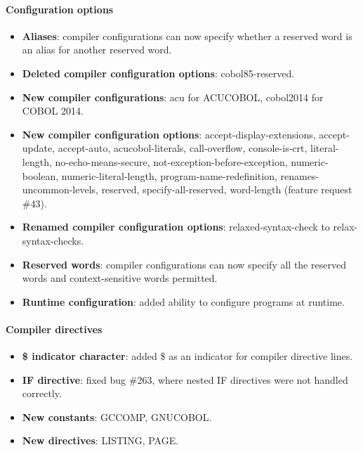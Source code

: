 \paragraph{Configuration options}
\begin{itemize}
\item \textbf{Aliases}: compiler configurations can now specify whether a reserved word is an alias for another reserved word.
\item \textbf{Deleted compiler configuration options}: cobol85-reserved.
\item \textbf{New compiler configurations}: acu for ACUCOBOL, cobol2014 for COBOL 2014.
\item \textbf{New compiler configuration options}: accept-display-extensions, accept-update, accept-auto, acucobol-literals, call-overflow, console-is-crt, literal-length, no-echo-means-secure, not-exception-before-exception, numeric-boolean, numeric-literal-length, program-name-redefinition, renames-uncommon-levels, reserved, specify-all-reserved, word-length (feature request \#43).
\item \textbf{Renamed compiler configuration options}: relaxed-syntax-check to relax-syntax-checks.
\item \textbf{Reserved words}: compiler configurations can now specify all the reserved words and context-sensitive words permitted.
\item \textbf{Runtime configuration}: added ability to configure programs at runtime.
\end{itemize}

\paragraph{Compiler directives}
\begin{itemize}
\item \textbf{\$ indicator character}: added \$ as an indicator for compiler directive lines.
\item \textbf{\directiveindicator{}IF directive}: fixed bug \#263, where nested \directiveindicator{}IF directives were not handled correctly.
\item \textbf{New constants}: GCCOMP, GNUCOBOL.
\item \textbf{New directives}: \directiveindicator{}LISTING, \directiveindicator{}PAGE.
\end{itemize}

